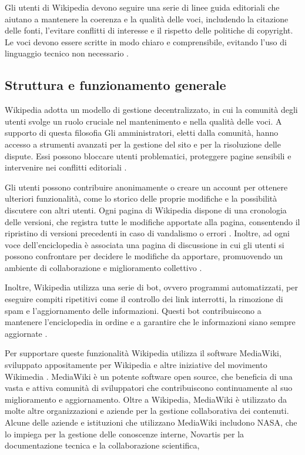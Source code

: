 \documentclass[12pt,a4paper]{report}
\begin{document}
Gli utenti di Wikipedia devono seguire una serie di linee guida editoriali che aiutano a mantenere la coerenza e la qualità delle voci, includendo la citazione delle fonti, l'evitare conflitti di interesse e il rispetto delle politiche di copyright. Le voci devono essere scritte in modo chiaro e comprensibile, evitando l'uso di linguaggio tecnico non necessario \cite{reagle2010good}.

\subsection{Struttura e funzionamento generale}

Wikipedia adotta un modello di gestione decentralizzato, in cui la comunità degli utenti svolge un ruolo cruciale nel mantenimento e nella qualità delle voci. A supporto di questa filosofia Gli amministratori, eletti dalla comunità, hanno accesso a strumenti avanzati per la gestione del sito e per la risoluzione delle dispute. Essi possono bloccare utenti problematici, proteggere pagine sensibili e intervenire nei conflitti editoriali \cite{denning2005wikipedia}.

Gli utenti possono contribuire anonimamente o creare un account per ottenere ulteriori funzionalità, come lo storico delle proprie modifiche e la possibilità discutere con altri utenti. Ogni pagina di Wikipedia dispone di una cronologia delle versioni, che registra tutte le modifiche apportate alla pagina, consentendo il ripristino di versioni precedenti in caso di vandalismo o errori \cite{wikiwikiweb}. Inoltre, ad ogni voce dell'enciclopedia è associata una pagina di discussione in cui gli utenti si possono confrontare per decidere le modifiche da apportare, promuovendo un ambiente di collaborazione e miglioramento collettivo \cite{jemielniak2014wikipedia}.

Inoltre, Wikipedia utilizza una serie di bot, ovvero programmi automatizzati, per eseguire compiti ripetitivi come il controllo dei link interrotti, la rimozione di spam e l'aggiornamento delle informazioni. Questi bot contribuiscono a mantenere l'enciclopedia in ordine e a garantire che le informazioni siano sempre aggiornate \cite{history_of_wikis}.

Per supportare queste funzionalità Wikipedia utilizza il software MediaWiki, sviluppato appositamente per Wikipedia e altre iniziative del movimento Wikimedia \cite{denning2005wikipedia}. MediaWiki è un potente software open source, che beneficia di una vasta e attiva comunità di sviluppatori che contribuiscono continuamente al suo miglioramento e aggiornamento. Oltre a Wikipedia, MediaWiki è utilizzato da molte altre organizzazioni e aziende per la gestione collaborativa dei contenuti. Alcune delle aziende e istituzioni che utilizzano MediaWiki includono NASA, che lo impiega per la gestione delle conoscenze interne, Novartis per la documentazione tecnica e la collaborazione scientifica,
\end{document}
